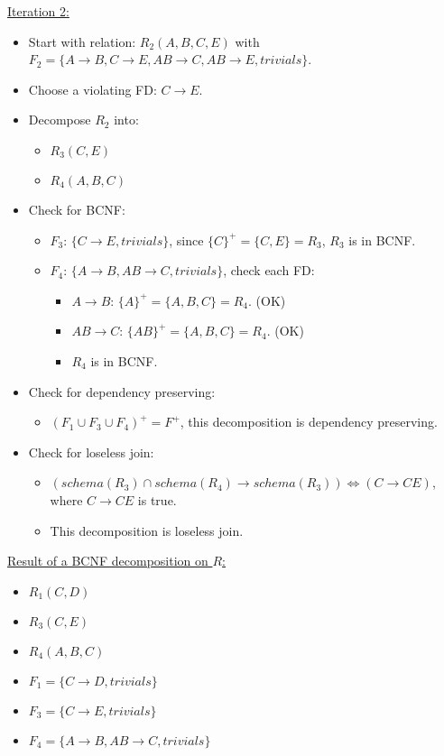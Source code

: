 \documentclass{article}[a4paper,11pt]
\begin{document}
\underline{Iteration 2:}
\begin{itemize}
    \item Start with relation: $R_2(A,B,C,E)$ with $F_2 = \{ A \rightarrow B, C \rightarrow E, AB \rightarrow C, AB \rightarrow E, trivials\}$.
    \item Choose a violating FD: $C \rightarrow E$.
    \item Decompose $R_2$ into:
    \begin{itemize}
        \item $R_3(C,E)$
        \item $R_4(A,B,C)$
    \end{itemize}
    \item Check for BCNF:
    \begin{itemize}
        \item $F_3$: $\{ C \rightarrow E, trivials\}$, since $\{C\}^+ = \{C,E\} = R_3$, $R_3$ is in BCNF.
        \item $F_4$: $\{ A \rightarrow B, AB \rightarrow C, trivials\}$, check each FD:
        \begin{itemize}
            \item $A \rightarrow B$: $\{ A \}^+ = \{ A, B, C \} = R_4$. (OK)
            \item $AB \rightarrow C$: $\{ AB \}^+ = \{ A, B, C \} = R_4$. (OK)
            \item $R_4$ is in BCNF.
        \end{itemize}
    \end{itemize}
    \item Check for dependency preserving:
    \begin{itemize}
        \item $(F_1 \cup F_3 \cup F_4)^+ = F^+$, this decomposition is dependency preserving.
    \end{itemize}
    \item Check for loseless join:
    \begin{itemize}
        \item $(schema (R_3) \cap schema(R_4) \rightarrow schema(R_3)) \Leftrightarrow (C \rightarrow CE)$, where $C \rightarrow CE$ is true.
        \item This decomposition is loseless join.
    \end{itemize}
\end{itemize}

\underline{Result of a BCNF decomposition on $R$:}

\begin{itemize}
    \item $R_1(C,D)$
    \item $R_3(C,E)$
    \item $R_4(A,B,C)$
    \item $F_1 = \{ C \rightarrow D, trivials\}$
    \item $F_3 = \{ C \rightarrow E, trivials\}$
    \item $F_4 = \{ A \rightarrow B, AB \rightarrow C, trivials\}$
\end{itemize}
\end{document}

